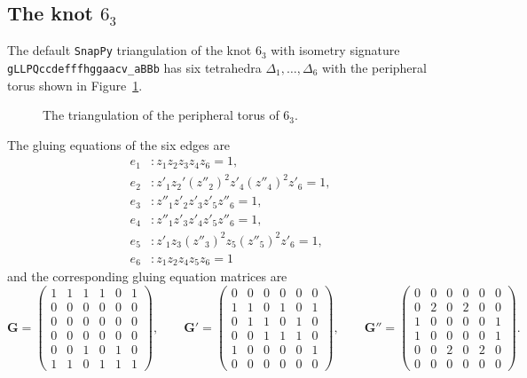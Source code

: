 \documentclass[12pt,reqno]{amsart}
\theoremstyle{definition}
\def\be{\begin{equation}}
\def\ee{\end{equation}}
\begin{document}
\subsection{The  knot $6_3$}
\label{sub.63a}

The default \texttt{SnapPy} triangulation of the knot $6_3$ with isometry signature
\texttt{gLLPQccdefffhggaacv\_aBBb} has six tetrahedra $\Delta_1,\ldots,\Delta_6$
with the peripheral torus shown in Figure~\ref{fig.torus63}. 

\begin{figure}[htpb!]

\caption{The triangulation of the peripheral torus of $6_3$.}
\label{fig.torus63}
\end{figure}

The gluing equations of the six edges are 
\begin{align*}
e_1 & : z_1 z_2 z_3 z_4 z_6 =1,\\
e_2 & : z'_1 z_2' (z''_2)^2 z'_4 (z''_4)^2 z'_6=1,\\
e_3 & : z''_1 z'_2 z'_3 z'_5 z''_6 =1, \\
e_4 & : z''_1 z'_3 z'_4 z'_5 z''_6 =1, \\
e_5 & : z'_1 z_3 (z''_3)^2 z_5 (z''_5)^2 z'_6 = 1, \\
e_6 &:  z_1 z_2 z_4 z_5 z_6 =1 
\end{align*}
and the corresponding gluing equation matrices are 
{\tiny
\be
\mathbf{G} = \begin{pmatrix}
1 & 1 & 1 & 1 & 0 & 1 \\
0 & 0 & 0 & 0 & 0 & 0 \\
0 & 0 & 0 & 0 & 0 & 0 \\
0 & 0 & 0 & 0 & 0 & 0 \\
0 & 0 & 1 & 0 & 1 & 0 	\\
1 & 1 & 0 & 1 & 1 & 1
\end{pmatrix}, \qquad
\mathbf{G}' = \begin{pmatrix}
0 & 0 & 0 & 0 & 0 & 0 \\
1 & 1 & 0 & 1 & 0 & 1 \\
0 & 1 & 1 & 0 & 1 & 0 \\
0 & 0 & 1 & 1 & 1 & 0 \\
1 & 0 & 0 & 0 & 0 & 1 	\\
0 & 0 & 0 & 0 & 0 & 0
\end{pmatrix}, \qquad
\mathbf{G}'' = \begin{pmatrix}
0 & 0 & 0 & 0 & 0 & 0 \\
0 & 2 & 0 & 2 & 0 & 0 \\
1 & 0 & 0 & 0 & 0 & 1 \\
1 & 0 & 0 & 0 & 0 & 1 \\
0 & 0 & 2 & 0 & 2 & 0 	\\
0 & 0 & 0 & 0 & 0 & 0
\end{pmatrix}  .
\ee
}
\end{document}
